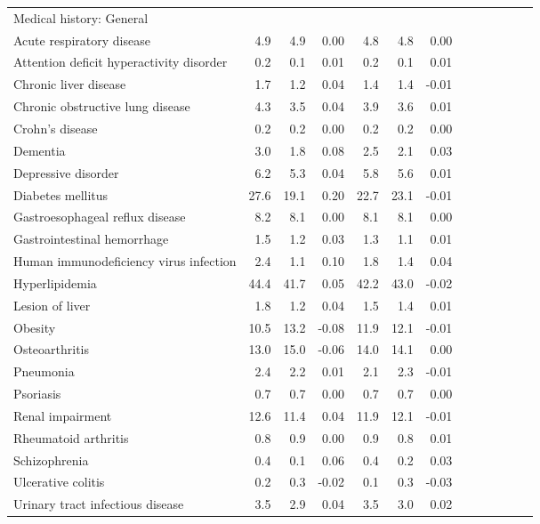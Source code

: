 \documentclass[11pt,]{article}
\begin{document}
\begin{longtable}{lrrrrrrrrrrrr}
  Medical history: General &    &    &     &    &    &     \\ 
      Acute respiratory disease &  4.9 &  4.9 &  0.00 &  4.8 &  4.8 &  0.00 \\ 
      Attention deficit hyperactivity disorder &  0.2 &  0.1 &  0.01 &  0.2 &  0.1 &  0.01 \\ 
      Chronic liver disease &  1.7 &  1.2 &  0.04 &  1.4 &  1.4 & -0.01 \\ 
      Chronic obstructive lung disease &  4.3 &  3.5 &  0.04 &  3.9 &  3.6 &  0.01 \\ 
      Crohn's disease &  0.2 &  0.2 &  0.00 &  0.2 &  0.2 &  0.00 \\ 
      Dementia &  3.0 &  1.8 &  0.08 &  2.5 &  2.1 &  0.03 \\ 
      Depressive disorder &  6.2 &  5.3 &  0.04 &  5.8 &  5.6 &  0.01 \\ 
      Diabetes mellitus & 27.6 & 19.1 &  0.20 & 22.7 & 23.1 & -0.01 \\ 
      Gastroesophageal reflux disease &  8.2 &  8.1 &  0.00 &  8.1 &  8.1 &  0.00 \\ 
      Gastrointestinal hemorrhage &  1.5 &  1.2 &  0.03 &  1.3 &  1.1 &  0.01 \\ 
      Human immunodeficiency virus infection &  2.4 &  1.1 &  0.10 &  1.8 &  1.4 &  0.04 \\ 
      Hyperlipidemia & 44.4 & 41.7 &  0.05 & 42.2 & 43.0 & -0.02 \\ 
      Lesion of liver &  1.8 &  1.2 &  0.04 &  1.5 &  1.4 &  0.01 \\ 
      Obesity & 10.5 & 13.2 & -0.08 & 11.9 & 12.1 & -0.01 \\ 
      Osteoarthritis & 13.0 & 15.0 & -0.06 & 14.0 & 14.1 &  0.00 \\ 
      Pneumonia &  2.4 &  2.2 &  0.01 &  2.1 &  2.3 & -0.01 \\ 
      Psoriasis &  0.7 &  0.7 &  0.00 &  0.7 &  0.7 &  0.00 \\ 
      Renal impairment & 12.6 & 11.4 &  0.04 & 11.9 & 12.1 & -0.01 \\ 
      Rheumatoid arthritis &  0.8 &  0.9 &  0.00 &  0.9 &  0.8 &  0.01 \\ 
      Schizophrenia &  0.4 &  0.1 &  0.06 &  0.4 &  0.2 &  0.03 \\ 
      Ulcerative colitis &  0.2 &  0.3 & -0.02 &  0.1 &  0.3 & -0.03 \\ 
      Urinary tract infectious disease &  3.5 &  2.9 &  0.04 &  3.5 &  3.0 &  0.02 \\ 

\end{longtable}
\end{document}
